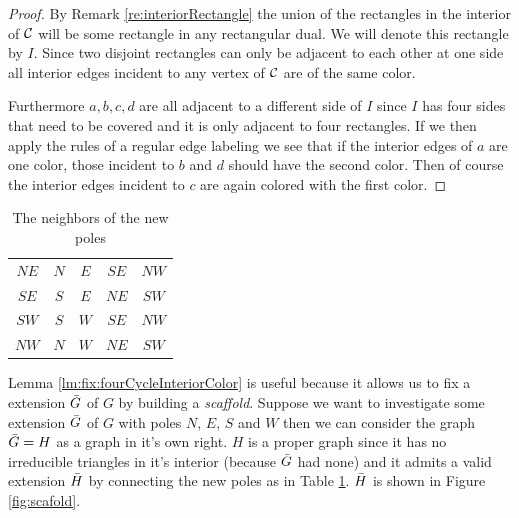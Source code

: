   \begin{proof}
  By Remark \ref{re:interiorRectangle} the union of the rectangles in the interior of $\mathcal{C}$ will be some rectangle in any rectangular dual. We will denote this rectangle by $I$. Since two disjoint rectangles can only be adjacent to each other at one side all interior edges incident to any vertex of $\mathcal{C}$ are of the same color.

  Furthermore $a, b, c, d$ are all adjacent to a different side of $I$ since $I$ has four sides that need to be covered and it is only adjacent to four rectangles. If we then apply the rules of a regular edge labeling we see that if the interior edges of $a$ are one color, those incident to $b$ and $d$ should have the second color. Then of course the interior edges incident to $c$ are again colored with the first color.

  \end{proof}


  \begin{table}
    \centering
    \begin{tabular}{c|| c c c c}
      $NE$ & $N$ & $ E$ & $ SE$ & $ NW$ \\
      $SE$ & $S$ & $ E$ & $ NE$ & $ SW$\\
      $SW$ & $S$ & $ W$ & $ SE$ & $ NW$\\
      $NW$ & $N$ & $ W$ & $ NE$ & $ SW$\\
    \end{tabular}
    \caption{The neighbors of the new poles}
    \label{tab:scaffold}
  \end{table}

  Lemma \ref{lm:fix:fourCycleInteriorColor} is useful because it allows us to fix a extension $\bar{G}$ of $G$ by building a \emph{scaffold}. Suppose we want to investigate some extension $\bar{G}$ of $G$ with poles $N$, $E$, $S$ and $W$ then we can consider the graph $\bar{G} = H$ as a graph in it's own right. $H$ is a proper graph since it has no irreducible triangles in it's interior (because $\bar{G}$ had none) and it admits a valid extension $\bar{H}$ by connecting the new poles as in Table \ref{tab:scaffold}. $\bar{H}$ is shown in Figure \ref{fig:scafold}.


